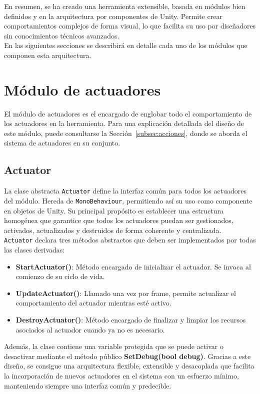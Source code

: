 En resumen, se ha creado una herramienta extensible, basada en módulos bien definidos y en la arquitectura por componentes de Unity. Permite crear comportamientos complejos de forma visual, lo que facilita su uso por diseñadores sin conocimientos técnicos avanzados.\\

En las siguientes secciones se describirá en detalle cada uno de los módulos que componen esta arquitectura.

\section{Módulo de actuadores}

El módulo de actuadores es el encargado de englobar todo el comportamiento de los actuadores en la herramienta. Para una explicación detallada del diseño de este módulo, puede consultarse la Sección~\ref{subsec:acciones}, donde se aborda el sistema de actuadores en su conjunto.

\subsection{Actuator}

La clase abstracta \texttt{Actuator} define la interfaz común para todos los actuadores del módulo. Hereda de \texttt{MonoBehaviour}, permitiendo así su uso como componente en objetos de Unity. Su principal propósito es establecer una estructura homogénea que garantice que todos los actuadores puedan ser gestionados, activados, actualizados y destruidos de forma coherente y centralizada.\\

\texttt{Actuator} declara tres métodos abstractos que deben ser implementados por todas las clases derivadas:

\begin{itemize}
\item \textbf{StartActuator()}: Método encargado de inicializar el actuador. Se invoca al comienzo de su ciclo de vida.
\item \textbf{UpdateActuator()}: Llamado una vez por frame, permite actualizar el comportamiento del actuador mientras esté activo.
\item \textbf{DestroyActuator()}: Método encargado de finalizar y limpiar los recursos asociados al actuador cuando ya no es necesario.
\end{itemize}

Además, la clase contiene una variable protegida que se puede activar o desactivar mediante el método público \textbf{SetDebug(bool debug)}.
Gracias a este diseño, se consigue una arquitectura flexible, extensible y desacoplada que facilita la incorporación de nuevos actuadores en el sistema con un esfuerzo mínimo, manteniendo siempre una interfaz común y predecible.

